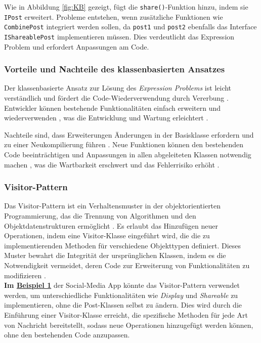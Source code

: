 \documentclass{easychair}
\begin{document}
  \noindent Wie in Abbildung \ref{fig:KB} gezeigt, fügt die \texttt{share()}-Funktion hinzu, indem sie \texttt{IPost} erweitert. Probleme entstehen, wenn zusätzliche Funktionen wie \texttt{CombinePost} integriert werden sollen, da \texttt{post1} und \texttt{post2} ebenfalls das Interface \texttt{IShareablePost} implementieren müssen. Dies verdeutlicht das Expression Problem und erfordert Anpassungen am Code.

  \subsubsection*{Vorteile und Nachteile des klassenbasierten Ansatzes}


  Der klassenbasierte Ansatz zur Lösung des \textit{Expression Problems} ist leicht verständlich und fördert die Code-Wiederverwendung durch Vererbung \cite{gamma1994design}. Entwickler können bestehende Funktionalitäten einfach erweitern und wiederverwenden \cite{Cook1990}, was die Entwicklung und Wartung erleichtert \cite{torgersen2004expression}.

  Nachteile sind, dass Erweiterungen Änderungen in der Basisklasse erfordern und zu einer Neukompilierung führen \cite{wadler1998expression}. Neue Funktionen können den bestehenden Code beeinträchtigen und Anpassungen in allen abgeleiteten Klassen notwendig machen \cite{Reynolds1978}, was die Wartbarkeit erschwert und das Fehlerrisiko erhöht \cite{hughes1989functional}.
  


    \subsubsection{Visitor-Pattern}
    Das Visitor-Pattern ist ein Verhaltensmuster in der objektorientierten Programmierung, das die Trennung von Algorithmen und den Objektdatenstrukturen ermöglicht \cite{gamma1994design}. Es erlaubt das Hinzufügen neuer Operationen, indem eine Visitor-Klasse eingeführt wird, die die zu implementierenden Methoden für verschiedene Objekttypen definiert. Dieses Muster bewahrt die Integrität der ursprünglichen Klassen, indem es die Notwendigkeit vermeidet, deren Code zur Erweiterung von Funktionalitäten zu modifizieren \cite{gamma1994design}.\\
    
    \textbf{Im \hyperlink{beispiel1}{Beispiel 1}} der Social-Media App könnte das Visitor-Pattern verwendet werden, um unterschiedliche Funktionalitäten wie \textit{Display} und \textit{Shareable} zu implementieren, ohne die Post-Klassen selbst zu ändern. Dies wird durch die Einführung einer Visitor-Klasse erreicht, die spezifische Methoden für jede Art von Nachricht bereitstellt, sodass neue Operationen hinzugefügt werden können, ohne den bestehenden Code anzupassen.
\end{document}
